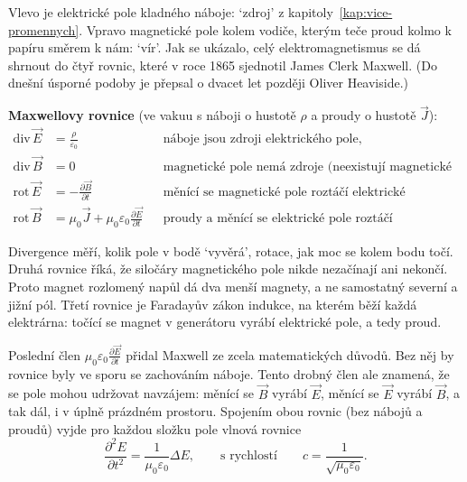 Vlevo je elektrické pole kladného náboje: `zdroj' z kapitoly~\ref{kap:vice-promennych}. Vpravo magnetické pole kolem vodiče, kterým teče proud kolmo k papíru směrem k nám: `vír'. Jak se ukázalo, celý elektromagnetismus se dá shrnout do čtyř rovnic, které v roce 1865 sjednotil James Clerk Maxwell. (Do dnešní úsporné podoby je přepsal o dvacet let později Oliver Heaviside.)

\begin{definitionbox}
  \textbf{Maxwellovy rovnice} (ve vakuu s náboji o hustotě $\rho$ a proudy o hustotě $\vec{J}$):
  \begin{align*}
    \mathrm{div}\,\vec{E} &= \frac{\rho}{\varepsilon_0} & &\text{náboje jsou zdroji elektrického pole,}\\
    \mathrm{div}\,\vec{B} &= 0 & &\text{magnetické pole nemá zdroje (neexistují magnetické monopóly),}\\
    \mathrm{rot}\,\vec{E} &= -\frac{\partial\vec{B}}{\partial t} & &\text{měnící se magnetické pole roztáčí elektrické (indukce),}\\
    \mathrm{rot}\,\vec{B} &= \mu_0\vec{J} + \mu_0\varepsilon_0\frac{\partial\vec{E}}{\partial t} & &\text{proudy a měnící se elektrické pole roztáčí magnetické.}
  \end{align*}
\end{definitionbox}

Divergence měří, kolik pole v bodě `vyvěrá', rotace, jak moc se kolem bodu točí. Druhá rovnice říká, že siločáry magnetického pole nikde nezačínají ani nekončí. Proto magnet rozlomený napůl dá dva menší magnety, a ne samostatný severní a jižní pól. Třetí rovnice je Faradayův zákon indukce, na kterém běží každá elektrárna: točící se magnet v generátoru vyrábí elektrické pole, a tedy proud.

Poslední člen $\mu_0\varepsilon_0\frac{\partial\vec{E}}{\partial t}$ přidal Maxwell ze zcela matematických důvodů. Bez něj by rovnice byly ve sporu se zachováním náboje. Tento drobný člen ale znamená, že se pole mohou udržovat navzájem: měnící se $\vec{B}$ vyrábí $\vec{E}$, měnící se $\vec{E}$ vyrábí $\vec{B}$, a tak dál, i v úplně prázdném prostoru. Spojením obou rovnic (bez nábojů a proudů) vyjde pro každou složku pole vlnová rovnice
\begin{equation*}
  \frac{\partial^2E}{\partial t^2} = \frac{1}{\mu_0\varepsilon_0}\Delta E,\qquad\text{s rychlostí}\qquad c = \frac{1}{\sqrt{\mu_0\varepsilon_0}}.
\end{equation*}

